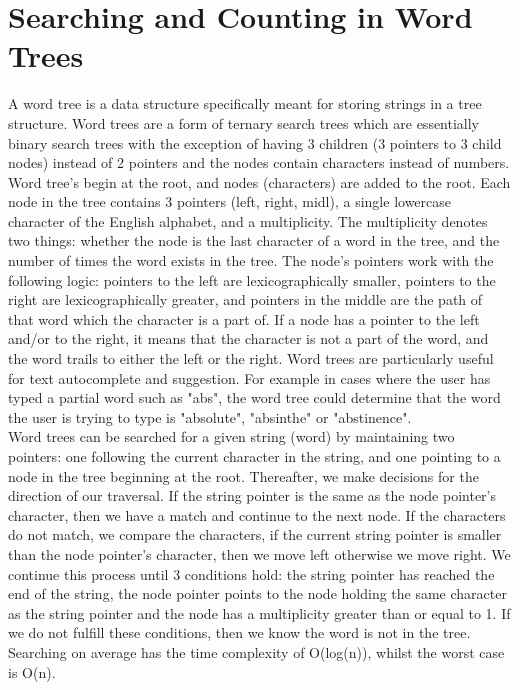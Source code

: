 \documentclass{article}
\begin{document}
  \section{Searching and Counting in Word Trees}
  \setlength{\parindent}{6ex}
  A word tree is a data structure specifically meant for storing strings in a tree structure. Word trees are a form of ternary search trees which are essentially binary search trees with the exception of having 3 children (3 pointers to 3 child nodes) instead of 2 pointers and the nodes contain characters instead of numbers. Word tree's begin at the root, and nodes (characters) are added to the root. Each node in the tree contains 3 pointers (left, right, midl), a single lowercase character of the English alphabet, and a multiplicity. The multiplicity denotes two things: whether the node is the last character of a word in the tree, and the number of times the word exists in the tree. The node's pointers work with the following logic: pointers to the left are lexicographically smaller, pointers to the right are lexicographically greater, and pointers in the middle are the path of that word which the character is a part of. If a node has a pointer to the left and/or to the right, it means that the character is not a part of the word, and the word trails to either the left or the right. Word trees are particularly useful for text autocomplete and suggestion. For example in cases where the user has typed a partial word such as "abs", the word tree could determine that the word the user is trying to type is "absolute", "absinthe" or "abstinence".
  \\[12pt]
  \indent Word trees can be searched for a given string (word) by maintaining two pointers: one following the current character in the string, and one pointing to a node in the tree beginning at the root. Thereafter, we make decisions for the direction of our traversal. If the string pointer is the same as the node pointer's character, then we have a match and continue to the next node. If the characters do not match, we compare the characters, if the current string pointer is smaller than the node pointer's character, then we move left otherwise we move right. We continue this process until 3 conditions hold: the string pointer has reached the end of the string, the node pointer points to the node holding the same character as the string pointer and the node has a multiplicity greater than or equal to 1. If we do not fulfill these conditions, then we know the word is not in the tree. Searching on average has the time complexity of O(log(n)), whilst the worst case is O(n).
\end{document}
